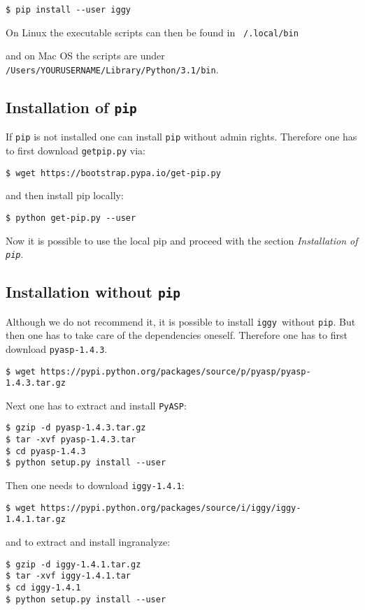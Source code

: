 \documentclass{article}
\newcommand\iggy{\texttt{iggy}}
\begin{document}
\begin{Verbatim}[frame=single]
$ pip install --user iggy
\end{Verbatim} 


On Linux the executable scripts can then be found in \texttt{~/.local/bin}

and on Mac OS the scripts are under \texttt{/Users/YOURUSERNAME/Library/Python/3.1/bin}.


\subsection{Installation of \texttt{pip}}
If \texttt{pip} is not installed one can install \texttt{pip} without admin rights.
Therefore one has to first download \texttt{getpip.py} via:
\begin{Verbatim}[frame=single]
$ wget https://bootstrap.pypa.io/get-pip.py
\end{Verbatim} 
and then install pip locally:
\begin{Verbatim}[frame=single]
$ python get-pip.py --user
\end{Verbatim} 
Now it is possible to use the local pip and proceed with the section \emph{Installation of \texttt{pip}}.

\subsection{Installation without \texttt{pip}}
Although we do not recommend it, it is possible to install \iggy\ without \texttt{pip}.
But then one has to take care of the dependencies oneself.
Therefore one has to first download \texttt{pyasp-1.4.3}.

\begin{Verbatim}[frame=single]
$ wget https://pypi.python.org/packages/source/p/pyasp/pyasp-1.4.3.tar.gz
\end{Verbatim}
Next one has to extract and install \texttt{PyASP}:
\begin{Verbatim}[frame=single]
$ gzip -d pyasp-1.4.3.tar.gz
$ tar -xvf pyasp-1.4.3.tar
$ cd pyasp-1.4.3
$ python setup.py install --user
\end{Verbatim}
Then one needs to download \texttt{iggy-1.4.1}:
\begin{Verbatim}[frame=single]
$ wget https://pypi.python.org/packages/source/i/iggy/iggy-1.4.1.tar.gz
\end{Verbatim}
and to extract and install ingranalyze:
\begin{Verbatim}[frame=single]
$ gzip -d iggy-1.4.1.tar.gz
$ tar -xvf iggy-1.4.1.tar
$ cd iggy-1.4.1
$ python setup.py install --user
\end{Verbatim}
\end{document}
